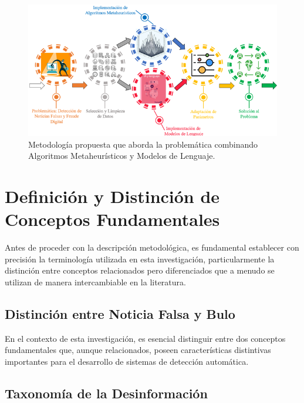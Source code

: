 \begin{figure}[h!]
    \centering
    \includegraphics[width=\textwidth]{Imagenes/metodologiaCompleta.png}
    \caption{Metodología propuesta que aborda la problemática combinando Algoritmos Metaheurísticos y Modelos de Lenguaje.}
    \label{fig:metodologia_general}
\end{figure}

\section{Definición y Distinción de Conceptos Fundamentales}
\label{sec:definicion_conceptos}

Antes de proceder con la descripción metodológica, es fundamental establecer con precisión la terminología utilizada en esta investigación, particularmente la distinción entre conceptos relacionados pero diferenciados que a menudo se utilizan de manera intercambiable en la literatura.

\subsection{Distinción entre Noticia Falsa y Bulo}

En el contexto de esta investigación, es esencial distinguir entre dos conceptos fundamentales que, aunque relacionados, poseen características distintivas importantes para el desarrollo de sistemas de detección automática.



\subsection{Taxonomía de la Desinformación}

